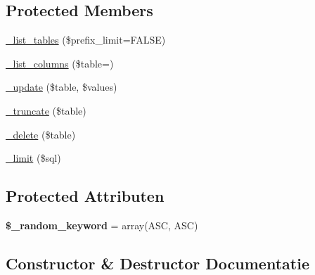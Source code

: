 \subsection*{Protected Members}
\begin{DoxyCompactItemize}
\item 
\mbox{\hyperlink{class_c_i___d_b__pdo__informix__driver_a435c0f3ce54fe7daa178baa8532ebd54}{\+\_\+list\+\_\+tables}} (\$prefix\+\_\+limit=F\+A\+L\+SE)
\item 
\mbox{\hyperlink{class_c_i___d_b__pdo__informix__driver_a7ccb7f9c301fe7f0a9db701254142b63}{\+\_\+list\+\_\+columns}} (\$table=\textquotesingle{}\textquotesingle{})
\item 
\mbox{\hyperlink{class_c_i___d_b__pdo__informix__driver_a2540b03a93fa73ae74c10d0e16fc073e}{\+\_\+update}} (\$table, \$values)
\item 
\mbox{\hyperlink{class_c_i___d_b__pdo__informix__driver_aa029600528fc1ce660a23ff4b4667f95}{\+\_\+truncate}} (\$table)
\item 
\mbox{\hyperlink{class_c_i___d_b__pdo__informix__driver_a133ea8446ded52589bd22cc9163d0896}{\+\_\+delete}} (\$table)
\item 
\mbox{\hyperlink{class_c_i___d_b__pdo__informix__driver_a3a02ea06541b8ecc25a33a61651562c8}{\+\_\+limit}} (\$sql)
\end{DoxyCompactItemize}
\subsection*{Protected Attributen}
\begin{DoxyCompactItemize}
\item 
\mbox{\label{class_c_i___d_b__pdo__informix__driver_a10213aa6e05f6d924d3277bb1d2fea00}} 
{\bfseries \$\+\_\+random\+\_\+keyword} = array(\textquotesingle{}A\+SC\textquotesingle{}, \textquotesingle{}A\+SC\textquotesingle{})
\end{DoxyCompactItemize}


\subsection{Constructor \& Destructor Documentatie}
\mbox{\label{class_c_i___d_b__pdo__informix__driver_a9162320adff1a1a4afd7f2372f753a3e}} 
